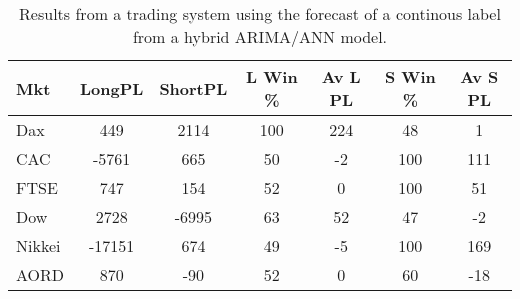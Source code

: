 \begin{table}[ht]
\centering
\caption[Results from a trading system using the forecast of a continous label from a hybrid ARIMA/ANN model]{Results from a trading system using the forecast of a continous label from a hybrid ARIMA/ANN model.} 
\label{tab:chp_ts:pUD_01_arima_ann_sys}
\begin{tabular}{lcccccc}
  \toprule Mkt & LongPL & ShortPL & L Win \% & Av L PL & S Win \% & Av S PL \\ 
  \midrule Dax & 449 & 2114 & 100 & 224 & 48 & 1 \\ 
  CAC & -5761 & 665 & 50 & -2 & 100 & 111 \\ 
  FTSE & 747 & 154 & 52 & 0 & 100 & 51 \\ 
  Dow & 2728 & -6995 & 63 & 52 & 47 & -2 \\ 
  Nikkei & -17151 & 674 & 49 & -5 & 100 & 169 \\ 
  AORD & 870 & -90 & 52 & 0 & 60 & -18 \\ 
   \bottomrule \end{tabular}
\end{table}

